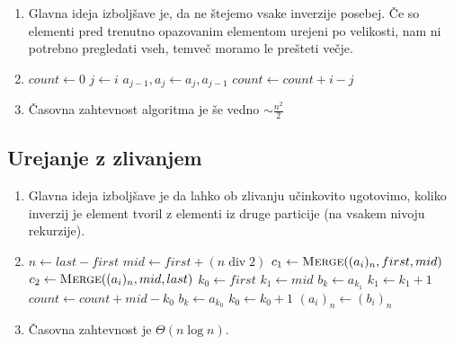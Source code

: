\documentclass[11pt,a4paper]{article}
\DeclareMathOperator{\Div}{div}
\theoremstyle{plain}
\theoremstyle{definition}
\begin{document}
\begin{enumerate}[label=\alph*)]
\item
Glavna ideja izboljšave je, da ne štejemo vsake inverzije posebej. Če so elementi pred trenutno opazovanim elementom urejeni po velikosti, nam ni potrebno pregledati vseh, temveč moramo le prešteti večje.

\item
\begin{algorithmic}
\State $count \gets 0$
    \State $j \gets i$
        \State $a_{j-1}, a_j \gets a_j, a_{j-1}$
    \EndWhile
    \State $count \gets count + i - j$
\EndFor
{}
\end{algorithmic}

\item
Časovna zahtevnost algoritma je še vedno $\sim \frac{n^2}{2}$

\end{enumerate}

\subsection{Urejanje z zlivanjem}

\begin{enumerate}[label=\alph*)]
\item
Glavna ideja izboljšave je da lahko ob zlivanju učinkovito ugotovimo, koliko inverzij je element tvoril z elementi iz druge particije (na vsakem nivoju rekurzije).

\item
\begin{algorithmic}
    \State $n \gets last - first$
    \EndIf
    \State $mid \gets first + (n \Div 2)$
    \State $c_1 \gets \Call{Merge}{(a_i)_n, first, mid}$
    \State $c_2 \gets \Call{Merge}{(a_i)_n, mid, last}$
    \State $k_0 \gets first$
    \State $k_1 \gets mid$
            \State $b_k \gets a_{k_1}$
            \State $k_1 \gets k_1 + 1$
            \State $count \gets count + mid - k_0$
        \Else
            \State $b_k \gets a_{k_0}$
            \State $k_0 \gets k_0 + 1$
        \EndIf
    \EndFor
    \State $(a_i)_n \gets (b_i)_n$
\EndFunction
\end{algorithmic}

\item
Časovna zahtevnost je $\Theta(n \log n)$.

\end{enumerate}
\end{document}
